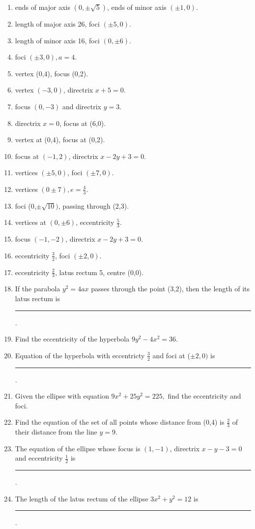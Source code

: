 \begin{enumerate}[label=\thesubsection.\arabic*,ref=\thesubsection.\theenumi,resume*]
\item ends of major axis $(0,\pm \sqrt{5})$, ends of minor axis $(\pm1,0)$.
\item length of major axis 26, foci $(\pm5,0)$.
\item length of minor axis 16, foci $(0,\pm6)$.
\item foci $(\pm3,0), a=4$.
\item vertex (0,4),  focus (0,2). 
\item vertex $(-3,0)$,  directrix $x+5=0$.
\item focus $(0,-3)$ and directrix $y=3$.
\item  directrix $x=0$, focus at (6,0).
\item  vertex  at (0,4), focus at (0,2).
\item  focus at $(-1,2)$, directrix $x-2y+3=0$.
	 \item  vertices $(\pm5,0)$, foci $(\pm 7,0)$.
	 \item vertices $(0\pm7), e =\frac{4}{3}$. 
	 \item  foci (0,$\pm\sqrt{10})$, passing through (2,3).
\item vertices at $(0,\pm6)$,  eccentricity $\frac{5}{3}$.
\item focus $(-1,-2)$,  directrix $x-2y+3=0$.
\item eccentricity $\frac{3}{2}$, foci $(\pm2,0)$.
 \item eccentricity $\frac{2}{3}$, latus rectum 5, centre  (0,0).
\item If the parabola $y^2=4ax$ passes through the point (3,2), then the length of its latus rectum is \rule{1cm}{0.1pt}.
\item Find the eccentricity of the hyperbola $9y^2-4x^2=36$.
\item Equation of the hyperbola with eccentricty $\frac{3}{2}$ and foci at ($\pm2,0)$ is \rule{1cm}{0.1pt}.
 \item Given the ellipse with equation $9x^2+25y^2=225,$ find the eccentricity and foci.
 \item Find the equation of the set of all points whose distance from (0,4) is $\frac{2}{3}$ of their distance from the line $y=9$.
\item The equation of the ellipse whose focus is $(1,-1)$, directrix $x-y-3
	=0$ and eccentricity $\frac{1}{2}$ is \rule{1cm}{0.1pt}.
\item The length of the latus rectum of the ellipse $3x^2+y^2=12$ is \rule{1cm}{0.1pt}.
\end{enumerate}
